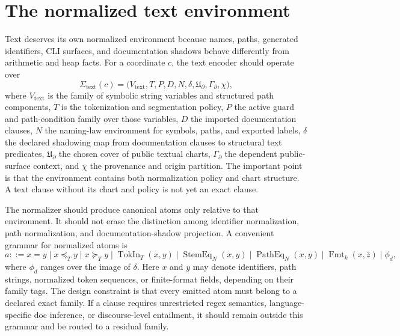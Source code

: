 \documentclass[11pt]{report}
\begin{document}
\section{The normalized text environment}
Text deserves its own normalized environment because names, paths, generated identifiers, CLI surfaces, and documentation shadows behave differently from arithmetic and heap facts. For a coordinate $c$, the text encoder should operate over
\[
\Sigma_{\mathrm{text}}(c)
=
\bigl(
V_{\mathrm{text}},
T,
P,
D,
N,
\delta,
\mathfrak{U}_{\partial},
\Gamma_{\partial},
\chi
\bigr),
\]
where $V_{\mathrm{text}}$ is the family of symbolic string variables and structured path components, $T$ is the tokenization and segmentation policy, $P$ the active guard and path-condition family over those variables, $D$ the imported documentation clauses, $N$ the naming-law environment for symbols, paths, and exported labels, $\delta$ the declared shadowing map from documentation clauses to structural text predicates, $\mathfrak{U}_{\partial}$ the chosen cover of public textual charts, $\Gamma_{\partial}$ the dependent public-surface context, and $\chi$ the provenance and origin partition. The important point is that the environment contains both normalization policy and chart structure. A text clause without its chart and policy is not yet an exact clause.

The normalizer should produce canonical atoms only relative to that environment. It should not erase the distinction among identifier normalization, path normalization, and documentation-shadow projection. A convenient grammar for normalized atoms is
\[
a ::= x = y
\mid x \preceq_{T} y
\mid x \succeq_{T} y
\mid \operatorname{TokIn}_{T}(x,y)
\mid \operatorname{StemEq}_{N}(x,y)
\mid \operatorname{PathEq}_{N}(x,y)
\mid \operatorname{Fmt}_{k}(x,\bar{z})
\mid \phi_d,
\]
where $\phi_d$ ranges over the image of $\delta$. Here $x$ and $y$ may denote identifiers, path strings, normalized token sequences, or finite-format fields, depending on their family tags. The design constraint is that every emitted atom must belong to a declared exact family. If a clause requires unrestricted regex semantics, language-specific doc inference, or discourse-level entailment, it should remain outside this grammar and be routed to a residual family.
\end{document}
